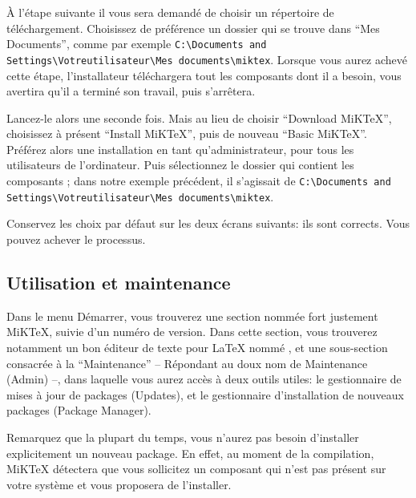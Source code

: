 À l'étape suivante il vous sera demandé de choisir un répertoire de téléchargement. Choisissez de préférence un dossier qui se trouve dans \enquote{Mes Documents}, comme par exemple \verb|C:\Documents and Settings\Votreutilisateur\Mes documents\miktex|. Lorsque vous aurez achevé cette étape, l'installateur téléchargera tout les composants dont il a besoin, vous avertira qu'il a terminé son travail, puis s'arrêtera.

Lancez-le alors une seconde fois. Mais au lieu de choisir \enquote{Download MiKTeX}, choisissez à présent \enquote{Install MiKTeX}, puis de nouveau \enquote{Basic MiKTeX}. Préférez alors une installation en tant qu'administrateur, pour tous les utilisateurs de l'ordinateur. Puis sélectionnez le dossier qui contient les composants ; dans notre exemple précédent, il s'agissait de \verb|C:\Documents and Settings\Votreutilisateur\Mes documents\miktex|.

Conservez les choix par défaut sur les deux écrans suivants: ils sont corrects. Vous pouvez achever le processus.


\subsection{Utilisation et maintenance}

Dans le menu Démarrer, vous trouverez une section nommée fort justement MiKTeX, suivie d'un numéro de version. Dans cette section, vous trouverez notamment un bon éditeur de texte  pour \LaTeX{} nommé , et une sous-section consacrée à la \enquote{Maintenance} – Répondant au doux nom de Maintenance (Admin) –, dans laquelle vous aurez accès à deux outils utiles: le gestionnaire de mises à jour de packages (Updates), et le gestionnaire d'installation de nouveaux packages (Package Manager).

Remarquez que la plupart du temps, vous n'aurez pas besoin d'installer explicitement un nouveau package. En effet, au moment de la compilation, MiKTeX détectera que vous sollicitez un composant qui n'est pas présent sur votre système et vous proposera de l'installer.
